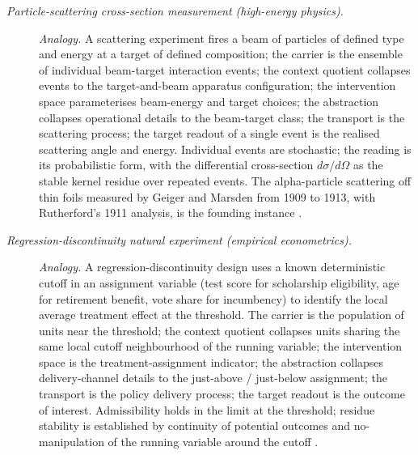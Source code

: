 \begin{description}
\item[\emph{Particle-scattering cross-section
measurement (high-energy physics).}] \textit{Analogy.}
A scattering experiment fires a beam of particles of
defined type and energy at a target of defined
composition; the carrier is the ensemble of individual
beam-target interaction events; the context quotient
collapses events to the target-and-beam apparatus
configuration; the intervention space parameterises
beam-energy and target choices; the abstraction
collapses operational details to the beam-target class;
the transport is the scattering process; the target
readout of a single event is the realised scattering
angle and energy.  Individual events are stochastic; the
 reading is its probabilistic form, with the
differential cross-section \(d\sigma/d\Omega\) as the
stable kernel residue over repeated events.
The alpha-particle scattering off thin foils measured by Geiger and
Marsden from 1909 to 1913, with Rutherford's 1911 analysis, is the
founding instance
\citep{GeigerMarsden1913Deflexion,Rutherford1911Scattering}.

\item[\emph{Regression-discontinuity natural experiment
(empirical econometrics).}] \textit{Analogy.}
A regression-discontinuity design uses a known
deterministic cutoff in an assignment variable (test
score for scholarship eligibility, age for retirement
benefit, vote share for incumbency) to identify the
local average treatment effect at the threshold.  The
carrier is the population of units near the threshold;
the context quotient collapses units sharing the same
local cutoff neighbourhood of the running variable; the
intervention space is the treatment-assignment
indicator; the abstraction collapses delivery-channel
details to the just-above / just-below assignment; the
transport is the policy delivery process; the target
readout is the outcome of interest.  Admissibility
holds in the limit at the threshold; residue stability
is established by continuity of potential outcomes and
no-manipulation of the running variable around the
cutoff \citep{ThistlethwaiteCampbell1960Regression}.
\end{description}
\endgroup

